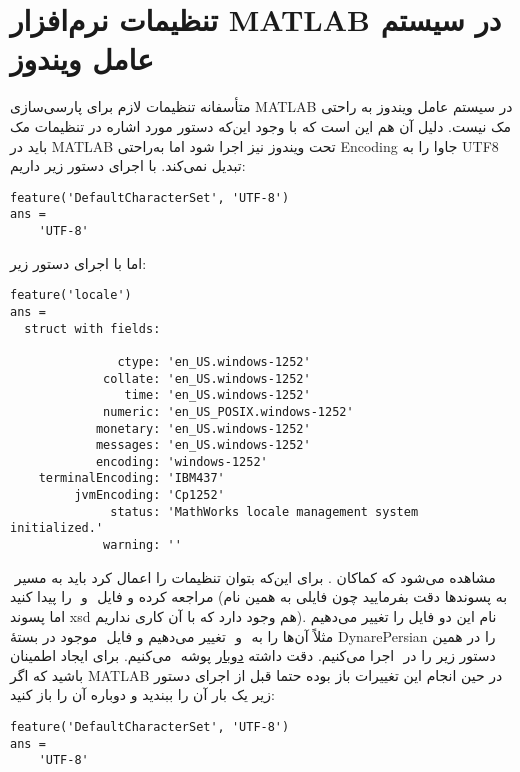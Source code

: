 \documentclass[12pt]{article}
\begin{document}
\section{تنظیمات نرم‌افزار MATLAB در سیستم عامل ویندوز}
متأسفانه تنظیمات لازم برای پارسی‌سازی MATLAB در سیستم عامل ویندوز به راحتی مک نیست. دلیل آن هم این است که با وجود این‌که دستور مورد اشاره در تنظیمات مک باید در MATLAB تحت ویندوز نیز اجرا شود اما به‌راحتی ‪Encoding‬‬‬ جاوا را به ‪UTF8 تبدیل نمی‌کند. با اجرای دستور زیر داریم:
\begin{latin}
\begin{lstlisting}[basicstyle=\scriptsize]
feature('DefaultCharacterSet', 'UTF-8')
ans =
    'UTF-8'
\end{lstlisting}
\end{latin}
اما با اجرای دستور زیر:
\begin{latin}
\begin{lstlisting}[basicstyle=\scriptsize]
feature('locale')
ans = 
  struct with fields:

               ctype: 'en_US.windows-1252'
             collate: 'en_US.windows-1252'
                time: 'en_US.windows-1252'
             numeric: 'en_US_POSIX.windows-1252'
            monetary: 'en_US.windows-1252'
            messages: 'en_US.windows-1252'
            encoding: 'windows-1252'
    terminalEncoding: 'IBM437'
         jvmEncoding: 'Cp1252'
              status: 'MathWorks locale management system initialized.'
             warning: ''
\end{lstlisting}
\end{latin}
مشاهده می‌شود که کماکان ‪‬‬‬‬. برای این‌که بتوان تنظیمات را اعمال کرد باید به مسیر ‪‬‬‬ مراجعه کرده و فایل ‪‬‬ و ‪‬‬‬‬ را پیدا کنید (به پسوند‌ها دقت بفرمایید چون فایلی به همین نام اما پسوند xsd هم وجود دارد که با آن کاری نداریم). نام این دو فایل را تغییر می‌دهیم مثلاً  آن‌ها را به  ‪‬‬ و ‪‬ تغییر می‌دهیم و ‬‬‬فایل ‪‬‬ ‬موجود در بستهٔ DynarePersian را در همین پوشه ‪‬‬‬ می‌کنیم. برای ایجاد اطمینان ‪\underline{دوبار}‬‬‬ دستور زیر را در ‪‬‬ اجرا می‌کنیم. دقت داشته باشید که اگر MATLAB در حین انجام این تغییرات باز بوده حتما قبل از اجرای دستور زیر یک بار آن را ببندید و دوباره آن را باز کنید:
\begin{latin}
\begin{lstlisting}[basicstyle=\scriptsize]
feature('DefaultCharacterSet', 'UTF-8')
ans =
    'UTF-8'
\end{lstlisting}
\end{latin}
\end{document}
